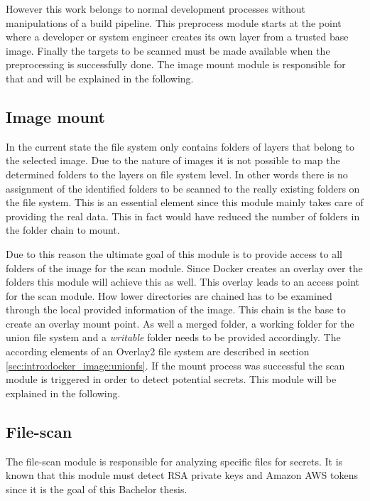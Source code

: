 However this work belongs to normal development processes without manipulations of a build pipeline.
This preprocess module starts at the point where a developer or system engineer creates its own layer from a trusted base image.
Finally the targets to be scanned must be made available when the preprocessing is successfully done. 
The image mount module is responsible for that and will be explained in the following.

\subsection{Image mount}
\label{ch:theory:analyzing_process:imgmount}
In the current state the file system only contains folders of layers that belong to the selected image.
Due to the nature of images it is not possible to map the determined folders to the layers on file system level. 
In other words there is no assignment of the identified folders to be scanned to the really existing folders on the file system.
This is an essential element since this module mainly takes care of providing the real data. 
This in fact would have reduced the number of folders in the folder chain to mount. 

Due to this reason the ultimate goal of this module is to provide access to all folders of the image for the scan module. 
Since Docker creates an overlay over the folders this module will achieve this as well. 
This overlay leads to an access point for the scan module. 
How lower directories are chained has to be examined through the local provided information of the image.
This chain is the base to create an overlay mount point.
As well a merged folder, a working folder for the union file system and a \textit{writable} folder needs to be provided accordingly.
The according elements of an Overlay2 file system are described in section \ref{sec:intro:docker_image:unionfs}.
If the mount process was successful the scan module is triggered in order to detect potential secrets. 
This module will be explained in the following.

\subsection{File-scan}
\label{ch:theory:analyzing_process:scan}
The file-scan module is responsible for analyzing specific files for secrets. 
It is known that this module must detect RSA private keys and Amazon AWS tokens since it is the goal of this Bachelor thesis.

